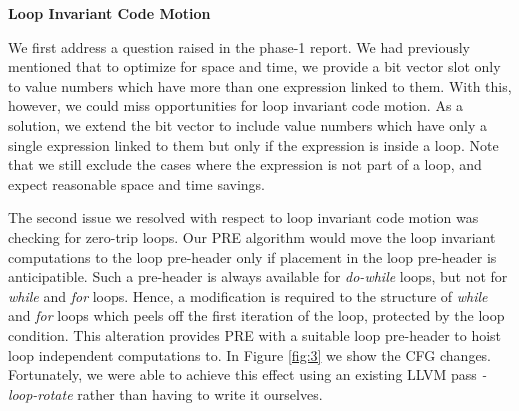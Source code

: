 \documentclass[10pt,twoside]{report}
\begin{document}
\begin{flushleft}
\textbf{\Large{Loop Invariant Code Motion}}
\end{flushleft}
We first address a question raised in the phase-1 report. We had previously
mentioned that to optimize for space and time, we provide a bit vector slot only to
value numbers which have more than one expression linked to them. With this,
      however, we could miss opportunities for loop invariant code motion. As a
      solution, we extend the bit vector to include value numbers which have
      only a single expression linked to them but only if the expression is
      inside a loop. Note that we still exclude the cases where the expression
      is not part of a loop, and expect reasonable space and time savings.  

      The second issue we resolved with respect to loop invariant code motion was 
      checking for zero-trip loops. Our PRE algorithm would move the loop invariant
      computations to the loop pre-header only if placement in the loop pre-header is 
      anticipatible. Such a pre-header is always available for \emph{do-while} loops, 
      but not for \emph{while} and \emph{for} loops. Hence, a modification is required
      to the structure of \emph{while} and \emph{for} loops which peels off the first
      iteration of the loop, protected by the loop condition. This alteration provides 
      PRE with a suitable loop pre-header to hoist loop independent computations to.
      In Figure \ref{fig:3} we show the CFG changes. Fortunately, we were able to 
      achieve this effect using an existing LLVM pass \emph{-loop-rotate} rather than
      having to write it ourselves.
\end{document}
